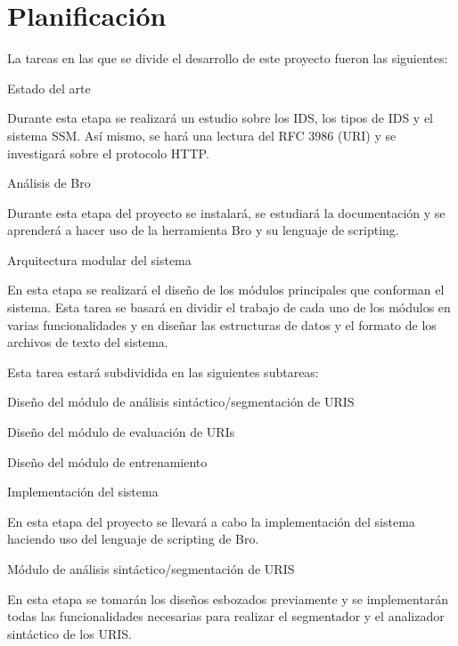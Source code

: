 \section*{Planificación}

La tareas en las que se divide el desarrollo de este proyecto fueron las siguientes:


\begin{legal}
\item Estado del arte

Durante esta etapa se realizará un estudio sobre los IDS, los tipos de IDS y el sistema SSM. Así mismo, se hará una lectura del RFC 3986 (URI) y se investigará sobre el protocolo HTTP.

\item Análisis de Bro

Durante esta etapa del proyecto se instalará, se estudiará la documentación y se aprenderá a hacer uso de la herramienta Bro y su lenguaje de scripting.

\item Arquitectura modular del sistema 

En esta etapa se realizará el diseño de los módulos principales que conforman el sistema. Esta tarea se basará en dividir el trabajo de cada uno de los módulos en varias funcionalidades y en diseñar las estructuras de datos y el formato de los archivos de texto del sistema.

    Esta tarea estará subdividida en las siguientes subtareas:

\begin{legal}
\item Diseño del módulo de análisis sintáctico/segmentación de URIS 
\item Diseño del módulo de evaluación de URIs 
\item Diseño del módulo de entrenamiento 
\end{legal}
\item Implementación del sistema

En esta etapa del proyecto se llevará a cabo la implementación del sistema haciendo uso del lenguaje de scripting de Bro.

\begin{legal}
\item Módulo de análisis sintáctico/segmentación de URIS 

En esta etapa se tomarán los diseños esbozados previamente y se implementarán todas las funcionalidades necesarias para realizar el segmentador y el analizador sintáctico de los URIS.


\end{legal}
\end{legal}
